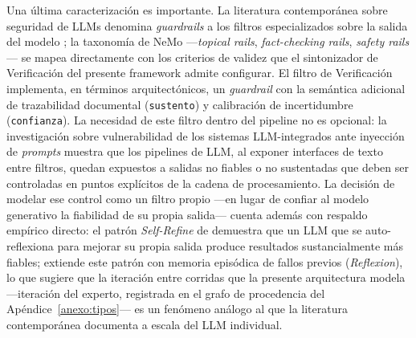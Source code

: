\documentclass[12pt]{report}
\begin{document}
Una última caracterización es importante. La literatura contemporánea sobre seguridad de LLMs denomina \textit{guardrails} a los filtros especializados sobre la salida del modelo \citep{rebedea:2023}; la taxonomía de NeMo ---\textit{topical rails}, \textit{fact-checking rails}, \textit{safety rails}--- se mapea directamente con los criterios de validez que el sintonizador de Verificación del presente framework admite configurar. El filtro de Verificación implementa, en términos arquitectónicos, un \textit{guardrail} con la semántica adicional de trazabilidad documental (\texttt{sustento}) y calibración de incertidumbre (\texttt{confianza}). La necesidad de este filtro dentro del pipeline no es opcional: la investigación sobre vulnerabilidad de los sistemas LLM-integrados ante inyección de \textit{prompts} \citep{liu:2023} muestra que los pipelines de LLM, al exponer interfaces de texto entre filtros, quedan expuestos a salidas no fiables o no sustentadas que deben ser controladas en puntos explícitos de la cadena de procesamiento. La decisión de modelar ese control como un filtro propio ---en lugar de confiar al modelo generativo la fiabilidad de su propia salida--- cuenta además con respaldo empírico directo: el patrón \textit{Self-Refine} de \citet{madaan:2023} demuestra que un LLM que se auto-reflexiona para mejorar su propia salida produce resultados sustancialmente más fiables; \citet{shinn:2023} extiende este patrón con memoria episódica de fallos previos (\textit{Reflexion}), lo que sugiere que la iteración entre corridas que la presente arquitectura modela ---iteración del experto, registrada en el grafo de procedencia del Apéndice~\ref{anexo:tipos}--- es un fenómeno análogo al que la literatura contemporánea documenta a escala del LLM individual.
\end{document}
